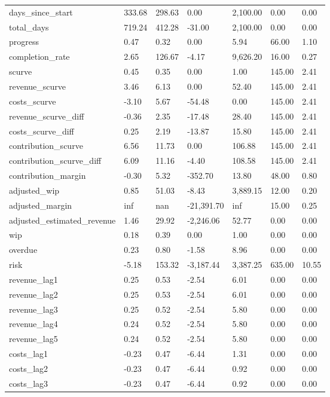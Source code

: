 \begin{landscape}
\begin{longtable}[h!]{lllllll}
days_since_start & 333.68 & 298.63 & 0.00 & 2,100.00 & 0.00 & 0.00 \\
total_days & 719.24 & 412.28 & -31.00 & 2,100.00 & 0.00 & 0.00 \\
progress & 0.47 & 0.32 & 0.00 & 5.94 & 66.00 & 1.10 \\
completion_rate & 2.65 & 126.67 & -4.17 & 9,626.20 & 16.00 & 0.27 \\
scurve & 0.45 & 0.35 & 0.00 & 1.00 & 145.00 & 2.41 \\
revenue_scurve & 3.46 & 6.13 & 0.00 & 52.40 & 145.00 & 2.41 \\
costs_scurve & -3.10 & 5.67 & -54.48 & 0.00 & 145.00 & 2.41 \\
revenue_scurve_diff & -0.36 & 2.35 & -17.48 & 28.40 & 145.00 & 2.41 \\
costs_scurve_diff & 0.25 & 2.19 & -13.87 & 15.80 & 145.00 & 2.41 \\
contribution_scurve & 6.56 & 11.73 & 0.00 & 106.88 & 145.00 & 2.41 \\
contribution_scurve_diff & 6.09 & 11.16 & -4.40 & 108.58 & 145.00 & 2.41 \\
contribution_margin & -0.30 & 5.32 & -352.70 & 13.80 & 48.00 & 0.80 \\
adjusted_wip & 0.85 & 51.03 & -8.43 & 3,889.15 & 12.00 & 0.20 \\
adjusted_margin & inf & nan & -21,391.70 & inf & 15.00 & 0.25 \\
adjusted_estimated_revenue & 1.46 & 29.92 & -2,246.06 & 52.77 & 0.00 & 0.00 \\
wip & 0.18 & 0.39 & 0.00 & 1.00 & 0.00 & 0.00 \\
overdue & 0.23 & 0.80 & -1.58 & 8.96 & 0.00 & 0.00 \\
risk & -5.18 & 153.32 & -3,187.44 & 3,387.25 & 635.00 & 10.55 \\
revenue_lag1 & 0.25 & 0.53 & -2.54 & 6.01 & 0.00 & 0.00 \\
revenue_lag2 & 0.25 & 0.53 & -2.54 & 6.01 & 0.00 & 0.00 \\
revenue_lag3 & 0.25 & 0.52 & -2.54 & 5.80 & 0.00 & 0.00 \\
revenue_lag4 & 0.24 & 0.52 & -2.54 & 5.80 & 0.00 & 0.00 \\
revenue_lag5 & 0.24 & 0.52 & -2.54 & 5.80 & 0.00 & 0.00 \\
costs_lag1 & -0.23 & 0.47 & -6.44 & 1.31 & 0.00 & 0.00 \\
costs_lag2 & -0.23 & 0.47 & -6.44 & 0.92 & 0.00 & 0.00 \\
costs_lag3 & -0.23 & 0.47 & -6.44 & 0.92 & 0.00 & 0.00 \\

\end{longtable}
\end{landscape}
